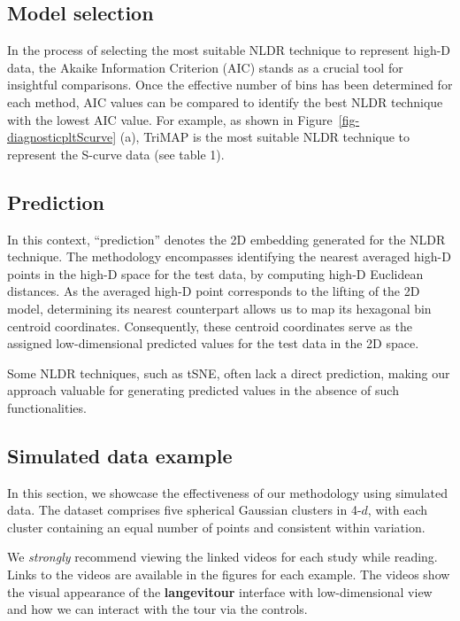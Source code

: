 \documentclass[
  12pt]{article}
\begin{document}
\hypertarget{sec-selection}{%
\subsection{Model selection}\label{sec-selection}}

In the process of selecting the most suitable NLDR technique to
represent high-D data, the Akaike Information Criterion (AIC) stands as
a crucial tool for insightful comparisons. Once the effective number of
bins has been determined for each method, AIC values can be compared to
identify the best NLDR technique with the lowest AIC value. For example,
as shown in Figure~\ref{fig-diagnosticpltScurve} (a), TriMAP is the most
suitable NLDR technique to represent the S-curve data (see table 1).

\hypertarget{sec-prediction}{%
\subsection{Prediction}\label{sec-prediction}}

In this context, ``prediction'' denotes the 2D embedding generated for
the NLDR technique. The methodology encompasses identifying the nearest
averaged high-D points in the high-D space for the test data, by
computing high-D Euclidean distances. As the averaged high-D point
corresponds to the lifting of the 2D model, determining its nearest
counterpart allows us to map its hexagonal bin centroid coordinates.
Consequently, these centroid coordinates serve as the assigned
low-dimensional predicted values for the test data in the 2D space.

Some NLDR techniques, such as tSNE, often lack a direct prediction,
making our approach valuable for generating predicted values in the
absence of such functionalities.

\hypertarget{sec-simpleex}{%
\subsection{Simulated data example}\label{sec-simpleex}}

In this section, we showcase the effectiveness of our methodology using
simulated data. The dataset comprises five spherical Gaussian clusters
in 4-\(d\), with each cluster containing an equal number of points and
consistent within variation.

We \emph{strongly} recommend viewing the linked videos for each study
while reading. Links to the videos are available in the figures for each
example. The videos show the visual appearance of the
\textbf{langevitour} interface with low-dimensional view and how we can
interact with the tour via the controls.
\end{document}
